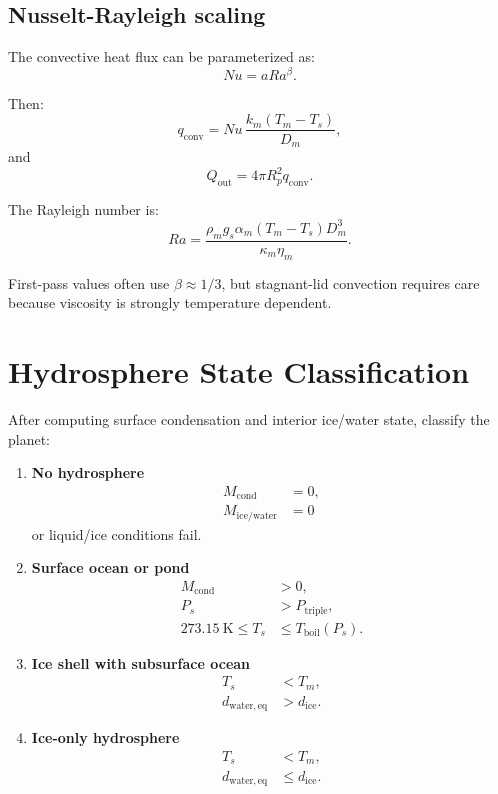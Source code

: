 \documentclass[11pt]{article}
\begin{document}
\subsection{Nusselt-Rayleigh scaling}

The convective heat flux can be parameterized as:
\begin{equation}
    Nu = a Ra^\beta.
\end{equation}

Then:
\begin{equation}
    q_{\mathrm{conv}}
    =
    Nu\,
    \frac{k_m(T_m-T_s)}{D_m},
\end{equation}
and
\begin{equation}
    Q_{\mathrm{out}} =
    4\pi R_p^2 q_{\mathrm{conv}}.
\end{equation}

The Rayleigh number is:
\begin{equation}
    Ra =
    \frac{
        \rho_m g_s \alpha_m (T_m-T_s) D_m^3
    }{
        \kappa_m \eta_m
    }.
\end{equation}

First-pass values often use $\beta \approx 1/3$, but stagnant-lid convection
requires care because viscosity is strongly temperature dependent.

\section{Hydrosphere State Classification}

After computing surface condensation and interior ice/water state, classify the
planet:

\begin{enumerate}
    \item \textbf{No hydrosphere}
    \begin{align}
        M_{\mathrm{cond}} &= 0, \\
        M_{\mathrm{ice/water}} &= 0
    \end{align}
    or liquid/ice conditions fail.

    \item \textbf{Surface ocean or pond}
    \begin{align}
        M_{\mathrm{cond}} &> 0, \\
        P_s &> P_{\mathrm{triple}}, \\
        273.15\ \mathrm{K} \leq T_s &\leq T_{\mathrm{boil}}(P_s).
    \end{align}

    \item \textbf{Ice shell with subsurface ocean}
    \begin{align}
        T_s &< T_m, \\
        d_{\mathrm{water,eq}} &> d_{\mathrm{ice}}.
    \end{align}

    \item \textbf{Ice-only hydrosphere}
    \begin{align}
        T_s &< T_m, \\
        d_{\mathrm{water,eq}} &\leq d_{\mathrm{ice}}.
    \end{align}
\end{enumerate}
\end{document}
